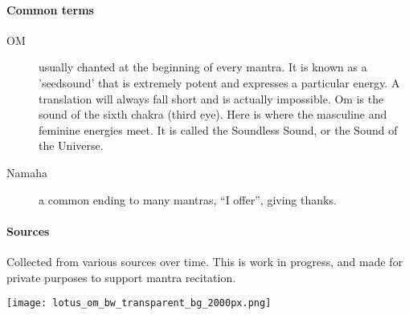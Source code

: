 \begin{intersong}
  \paragraph{Common terms}
  \begin{description}
   \item[OM] usually chanted at the beginning of every mantra. It is known as a 'seedsound' that 
     is extremely potent and expresses a particular energy. A translation will always fall short 
     and is actually impossible. Om is the sound of the sixth chakra (third eye). Here is where 
     the masculine and feminine energies meet. It is called the Soundless Sound, or the Sound of 
     the Universe.
   \item[Namaha] a common ending to many mantras, “I offer”, giving thanks.
  \end{description}

  \paragraph{Sources}
  Collected from various sources over time. This is work in progress, and made for private 
  purposes to support mantra recitation.

  \begin{center}
    \texttt{[image: lotus\_om\_bw\_transparent\_bg\_2000px.png]}
  \end{center}
\end{intersong}


